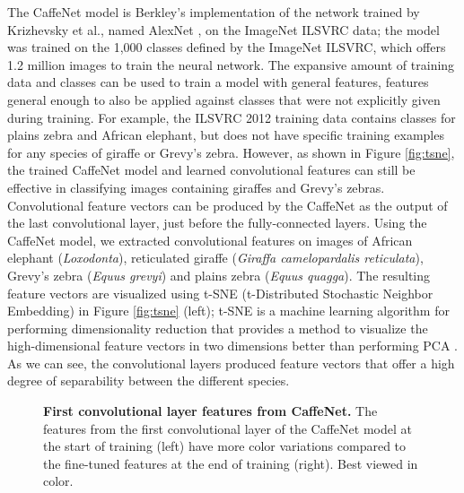 The CaffeNet model is Berkley's implementation of the network trained by Krizhevsky et al., named AlexNet \cite{krizhevsky_imagenet_2012}, on the ImageNet ILSVRC data; the model was trained on the 1,000 classes defined by the ImageNet ILSVRC, which offers 1.2 million images to train the neural network.  The expansive amount of training data and classes can be used to train a model with general features, features general enough to also be applied against classes that were not explicitly given during training.  For example, the ILSVRC 2012 training data contains classes for plains zebra and African elephant, but does not have specific training examples for any species of giraffe or Grevy's zebra.   However, as shown in Figure \ref{fig:tsne}, the trained CaffeNet model and learned convolutional features can still be effective in classifying images containing giraffes and Grevy's zebras.  Convolutional feature vectors can be produced by the CaffeNet as the output of the last convolutional layer, just before the fully-connected layers.  Using the CaffeNet model, we extracted convolutional features on images of African elephant (\textit{Loxodonta}), reticulated giraffe (\textit{Giraffa camelopardalis reticulata}), Grevy's zebra (\textit{Equus grevyi}) and plains zebra (\textit{Equus quagga}).  The resulting feature vectors are visualized using t-SNE (t-Distributed Stochastic Neighbor Embedding) \cite{van_der_maaten_visualizing_2008} in Figure \ref{fig:tsne} (left); t-SNE is a machine learning algorithm for performing dimensionality reduction that provides a method to visualize the high-dimensional feature vectors in two dimensions better than performing PCA \cite{jolliffe_principal_2002}.  As we can see, the convolutional layers produced feature vectors that offer a high degree of separability between the different species.

\begin{figure}[t]%
	\centering
    	\caption[First Convolutional Layer Features from CaffeNet]{\textbf{First convolutional layer features from CaffeNet.}  The features from the first convolutional layer of the CaffeNet model at the start of training (left) have more color variations compared to the fine-tuned features at the end of training (right).  Best viewed in color.}
    	\label{fig:features}
\end{figure}

